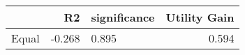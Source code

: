 \begin{tabular}{lrlr}
\toprule
{} &     R2 & significance &  Utility Gain \\
\midrule
Equal & -0.268 &       0.895  &         0.594 \\
\bottomrule
\end{tabular}
